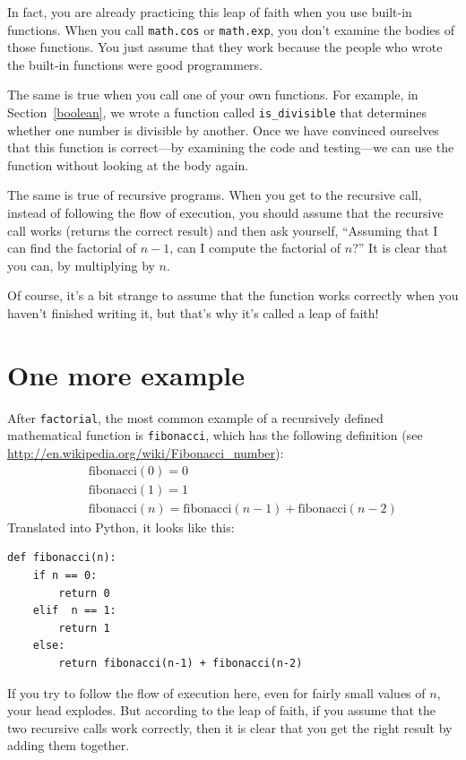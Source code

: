 \documentclass[10pt]{book}
\begin{document}
In fact, you are already practicing this leap of faith when you use
built-in functions.  When you call {\tt math.cos} or {\tt math.exp},
you don't examine the bodies of those functions.  You just
assume that they work because the people who wrote the built-in
functions were good programmers.

The same is true when you call one of your own functions.  For
example, in Section~\ref{boolean}, we wrote a function called
\verb"is_divisible" that determines whether one number is divisible by
another.  Once we have convinced ourselves that this function is
correct---by examining the code and testing---we can use the function
without looking at the body again.

The same is true of recursive programs.  When you get to the recursive
call, instead of following the flow of execution, you should assume
that the recursive call works (returns the correct result) and then ask
yourself, ``Assuming that I can find the factorial of $n-1$, can I
compute the factorial of $n$?''  It is clear that you
can, by multiplying by $n$.

Of course, it's a bit strange to assume that the function works
correctly when you haven't finished writing it, but that's why
it's called a leap of faith!


\section{One more example}
\label{one.more.example}

After {\tt factorial}, the most common example of a recursively
defined mathematical function is {\tt fibonacci}, which has the
following definition (see
  \url{http://en.wikipedia.org/wiki/Fibonacci_number}):
%
\begin{eqnarray*}
&& \mathrm{fibonacci}(0) = 0 \\
&& \mathrm{fibonacci}(1) = 1 \\
&& \mathrm{fibonacci}(n) = \mathrm{fibonacci}(n-1) + \mathrm{fibonacci}(n-2)
\end{eqnarray*}
%
Translated into Python, it looks like this:

\begin{verbatim}
def fibonacci(n):
    if n == 0:
        return 0
    elif  n == 1:
        return 1
    else:
        return fibonacci(n-1) + fibonacci(n-2)
\end{verbatim}
%
If you try to follow the flow of execution here, even for fairly
small values of $n$, your head explodes.  But according to the
leap of faith, if you assume that the two recursive calls
work correctly, then it is clear that you get
the right result by adding them together.
\end{document}
